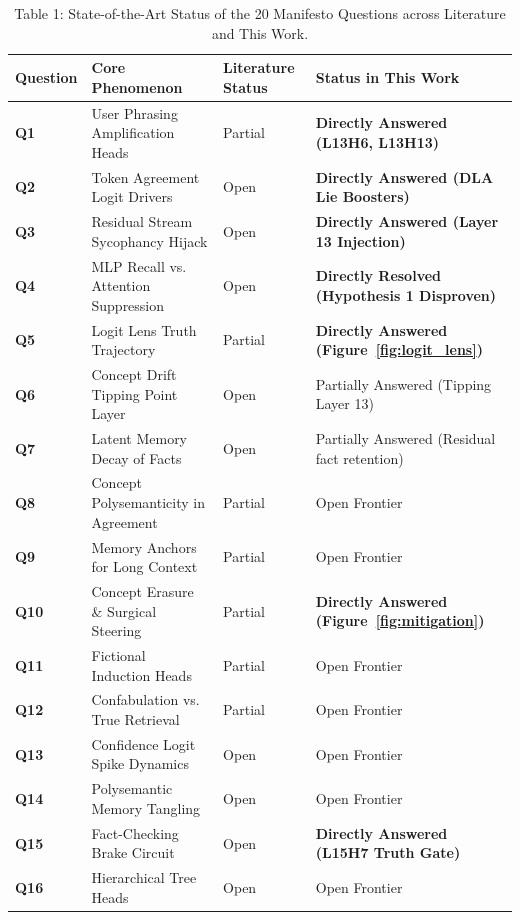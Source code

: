 \documentclass[journal,10pt,twocolumn]{IEEEtran}
\begin{document}
\begin{table}[htbp]
\centering
\small
\caption{Table 1: State-of-the-Art Status of the 20 Manifesto Questions across Literature and This Work.}
\label{tab:manifesto_status}
\begin{tabular}{lp{6.8cm}lp{4.2cm}}
\toprule
\textbf{Question} & \textbf{Core Phenomenon} & \textbf{Literature Status} & \textbf{Status in This Work} \\
\midrule
\textbf{Q1} & User Phrasing Amplification Heads & Partial \cite{sharma2023towards} & \textbf{Directly Answered (L13H6, L13H13)} \\
\textbf{Q2} & Token Agreement Logit Drivers & Open & \textbf{Directly Answered (DLA Lie Boosters)} \\
\textbf{Q3} & Residual Stream Sycophancy Hijack & Open & \textbf{Directly Answered (Layer 13 Injection)} \\
\textbf{Q4} & MLP Recall vs. Attention Suppression & Open & \textbf{Directly Resolved (Hypothesis 1 Disproven)} \\
\textbf{Q5} & Logit Lens Truth Trajectory & Partial \cite{meng2022locating} & \textbf{Directly Answered (Figure~\ref{fig:logit_lens})} \\
\midrule
\textbf{Q6} & Concept Drift Tipping Point Layer & Open & Partially Answered (Tipping Layer 13) \\
\textbf{Q7} & Latent Memory Decay of Facts & Open & Partially Answered (Residual fact retention) \\
\textbf{Q8} & Concept Polysemanticity in Agreement & Partial & Open Frontier \\
\textbf{Q9} & Memory Anchors for Long Context & Partial & Open Frontier \\
\textbf{Q10} & Concept Erasure \& Surgical Steering & Partial \cite{zou2023representation} & \textbf{Directly Answered (Figure~\ref{fig:mitigation})} \\
\midrule
\textbf{Q11} & Fictional Induction Heads & Partial \cite{olsson2022context} & Open Frontier \\
\textbf{Q12} & Confabulation vs. True Retrieval & Partial & Open Frontier \\
\textbf{Q13} & Confidence Logit Spike Dynamics & Open & Open Frontier \\
\textbf{Q14} & Polysemantic Memory Tangling & Open & Open Frontier \\
\textbf{Q15} & Fact-Checking Brake Circuit & Open & \textbf{Directly Answered (L15H7 Truth Gate)} \\
\midrule
\textbf{Q16} & Hierarchical Tree Heads & Open & Open Frontier \\

\end{tabular}
\end{table}
\end{document}
